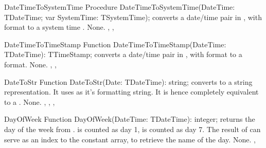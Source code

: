 \html{}
 
\begin{procedure}{DateTimeToSystemTime}
\Declaration
Procedure DateTimeToSystemTime(DateTime: TDateTime; var SystemTime: TSystemTime);
\Description
{} converts a date/time pair in , with
 format to a system time .
\Errors
None.
\SeeAlso
{}, ,
\end{procedure}

\html{}

\begin{function}{DateTimeToTimeStamp}
\Declaration
Function DateTimeToTimeStamp(DateTime: TDateTime): TTimeStamp;
\Description
{} converts a date/time pair in , with
 format to a  format.
\Errors
None.
\SeeAlso
{}, ,
\end{function}

\html{}

\begin{function}{DateToStr}
\Declaration
Function DateToStr(Date: TDateTime): string;
\Description
{} converts  to a string representation. It uses
 as it's formatting string. It is hence completely
equivalent to a .
\Errors
None.
\SeeAlso
{}, , ,
\end{function}


\html{}
 
\begin{function}{DayOfWeek}
\Declaration
Function DayOfWeek(DateTime: TDateTime): integer;
\Description
{} returns the day of the week from .
 is counted as day 1,  is counted as 
day 7. The result of  can serve as an index to 
the  constant array, to retrieve the name of 
the day.
\Errors
None.
\SeeAlso
{}, 
\end{function}


\html{}

